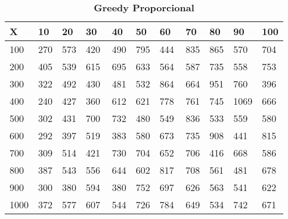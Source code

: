 \documentclass[10pt,letterpaper]{article}
\begin{document}
\begin{center}
\begin{table}\renewcommand{\arraystretch}{2.5}
\caption{\large \textbf{Greedy Proporcional}}
\centering
\begin{tabular} { |m{0.5cm}|m{1.3cm}|m{1.3cm}|m{1.3cm}|m{1.3cm}|m{1.3cm}|m{1.3cm}|m{1.3cm}|m{1.3cm}|m{1.3cm}|m{1.3cm}|} 
\hline
\rowcolor{Gray}
\centering \textbf{X} & \centering \textbf{10} & \centering \textbf{20} & \centering \textbf{30}\ & \centering \textbf{40} & \centering \textbf{50} & \centering \textbf{60}\ & \centering \textbf{70} & \centering \textbf{80} & \centering \textbf{90}\ & \textbf{100} \\\hline
\cellcolor{Gray}100 & \Large 270 & \Large 573 & \Large 420 & \Large 490 & \Large 795 & \Large 444 & \Large 835 & \Large 865 & \Large 570 & \Large 704 \\
\hline
\cellcolor{Gray}200 & \Large 405 & \Large 539 & \Large 615 & \Large 695 & \Large 633 & \Large 564 & \Large 587 & \Large 735 & \Large 558 & \Large 753 \\
\hline
\cellcolor{Gray}300 & \Large 322 & \Large 492 & \Large 430 & \Large 481 & \Large 532 & \Large 864 & \Large 664 & \Large 951 & \Large 760 & \Large 396 \\
\hline
\cellcolor{Gray}400 & \Large 240 & \Large 427 & \Large 360 & \Large 612 & \Large 621 & \Large 778 & \Large 761 & \Large 745 & \Large 1069 & \Large 666 \\
\hline
\cellcolor{Gray}500 & \Large 302 & \Large 431 & \Large 700 & \Large 732 & \Large 480 & \Large 549 & \Large 836 & \Large 533 & \Large 559 & \Large 580 \\
\hline
\cellcolor{Gray}600 & \Large 292 & \Large 397 & \Large 519 & \Large 383 & \Large 580 & \Large 673 & \Large 735 & \Large 908 & \Large 441 & \Large 815 \\
\hline
\cellcolor{Gray}700 & \Large 309 & \Large 514 & \Large 421 & \Large 730 & \Large 704 & \Large 652 & \Large 706 & \Large 416 & \Large 668 & \Large 586 \\
\hline
\cellcolor{Gray}800 & \Large 387 & \Large 543 & \Large 556 & \Large 644 & \Large 602 & \Large 817 & \Large 708 & \Large 561 & \Large 481 & \Large 678 \\
\hline
\cellcolor{Gray}900 & \Large 300 & \Large 380 & \Large 594 & \Large 380 & \Large 752 & \Large 697 & \Large 626 & \Large 563 & \Large 541 & \Large 622 \\
\hline
\cellcolor{Gray}1000 & \Large 372 & \Large 577 & \Large 607 & \Large 544 & \Large 726 & \Large 784 & \Large 649 & \Large 534 & \Large 742 & \Large 671 \\
\hline
\end{tabular} \\
\end{table}
\end{center}
\end{document}
